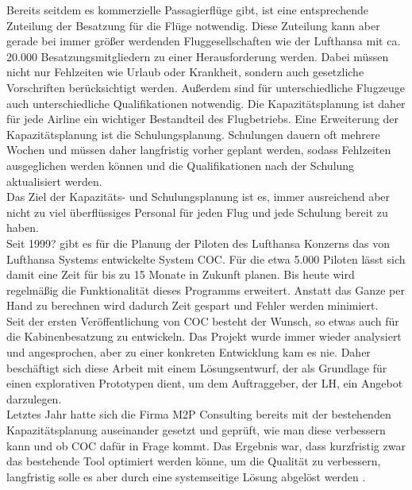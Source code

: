 \documentclass [12pt, a4paper, oneside, titlepage, ngerman]{article}
\begin{document}
Bereits seitdem es kommerzielle Passagierflüge gibt, ist eine entsprechende Zuteilung der Besatzung für die Flüge notwendig. Diese Zuteilung kann aber gerade bei immer größer werdenden Fluggesellschaften wie der Lufthansa mit ca. 20.000 Besatzungsmitgliedern zu einer Herausforderung werden. Dabei müssen nicht nur Fehlzeiten wie Urlaub oder Krankheit, sondern auch gesetzliche Vorschriften berücksichtigt werden. Außerdem sind für unterschiedliche Flugzeuge auch unterschiedliche Qualifikationen notwendig. Die Kapazitätsplanung ist daher für jede Airline ein wichtiger Bestandteil des Flugbetriebs.
Eine Erweiterung der Kapazitätsplanung ist die Schulungsplanung. Schulungen dauern oft mehrere Wochen und müssen daher langfristig vorher geplant werden, sodass Fehlzeiten ausgeglichen werden können und die Qualifikationen nach der Schulung aktualisiert werden. \\
Das Ziel der Kapazitäts- und Schulungsplanung ist es, immer ausreichend aber nicht zu viel überflüssiges Personal für jeden Flug und jede Schulung bereit zu haben. \\
Seit 1999? gibt es für die Planung der Piloten des Lufthansa Konzerns das von Lufthansa Systems entwickelte System \ac{COC}. Für die etwa 5.000 Piloten lässt sich damit eine Zeit für bis zu 15 Monate in Zukunft planen. Bis heute wird regelmäßig die Funktionalität dieses Programms erweitert. Anstatt das Ganze per Hand zu berechnen wird dadurch Zeit gespart und Fehler werden minimiert. \\
Seit der ersten Veröffentlichung von \ac{COC} besteht der Wunsch, so etwas auch für die Kabinenbesatzung zu entwickeln. Das Projekt wurde immer wieder analysiert und angesprochen, aber zu einer konkreten Entwicklung kam es nie. Daher beschäftigt sich diese Arbeit mit einem Lösungsentwurf, der als Grundlage für einen explorativen Prototypen dient, um dem Auftraggeber, der \ac{LH}, ein Angebot darzulegen.\\
Letztes Jahr hatte sich die Firma M2P Consulting bereits mit der bestehenden Kapazitätsplanung auseinander gesetzt und geprüft, wie man diese verbessern kann und ob \ac{COC} dafür in Frage kommt. Das Ergebnis war, dass kurzfristig zwar das bestehende Tool optimiert werden könne, um die Qualität zu verbessern, langfristig solle es aber durch eine systemseitige Lösung abgelöst werden \cite [S.8-10]{M2P}.
\end{document}
